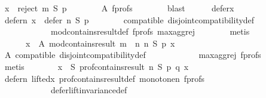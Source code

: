 \begin{isabellebody}
\ {\isachardoublequoteopen}x\ {\isasymin}\ reject\ m\ S\ p{\isachardoublequoteclose}\isanewline
\ \ \ \ \ \ \isamarkupfalse%
\ A\ f{\isacharunderscore}{\kern0pt}profs\isanewline
\ \ \ \ \ \ \isamarkupfalse%
\ blast\isanewline
\ \ \ \ \isamarkupfalse%
\ defer{\isacharunderscore}{\kern0pt}x\ \isamarkupfalse%
\ defer{\isacharunderscore}{\kern0pt}n{\isacharcolon}{\kern0pt}\ {\isachardoublequoteopen}x\ {\isasymin}\ defer\ n\ S\ p{\isachardoublequoteclose}\isanewline
\ \ \ \ \ \ \isamarkupfalse%
\ compatible\ disjoint{\isacharunderscore}{\kern0pt}compatibility{\isacharunderscore}{\kern0pt}def\isanewline
\ \ \ \ \ \ \ \ \ \ \ \ mod{\isacharunderscore}{\kern0pt}contains{\isacharunderscore}{\kern0pt}result{\isacharunderscore}{\kern0pt}def\ f{\isacharunderscore}{\kern0pt}profs\ max{\isacharunderscore}{\kern0pt}agg{\isacharunderscore}{\kern0pt}rej{}\isanewline
\ \ \ \ \ \ \isamarkupfalse%
\ metis\isanewline
\ \ \ \ \isamarkupfalse%
\isanewline
\ \ \ \ \ \ {\isachardoublequoteopen}{\isasymforall}x\ {\isasymin}\ A{\isachardot}{\kern0pt}\ mod{\isacharunderscore}{\kern0pt}contains{\isacharunderscore}{\kern0pt}result\ {\isacharparenleft}{\kern0pt}m\ {\isasymparallel}\isactrlsub {\isasymup}\ n{\isacharparenright}{\kern0pt}\ n\ S\ p\ x{\isachardoublequoteclose}\isanewline
\ \ \ \ \ \ \isamarkupfalse%
\ A\ compatible\ disjoint{\isacharunderscore}{\kern0pt}compatibility{\isacharunderscore}{\kern0pt}def\isanewline
\ \ \ \ \ \ \ \ \ \ \ \ max{\isacharunderscore}{\kern0pt}agg{\isacharunderscore}{\kern0pt}rej{}\ f{\isacharunderscore}{\kern0pt}profs\isanewline
\ \ \ \ \ \ \isamarkupfalse%
\ metis\isanewline
\ \ \ \ \isamarkupfalse%
\ \isamarkupfalse%
\ {\isachardoublequoteopen}{\isasymforall}x\ {\isasymin}\ S{\isachardot}{\kern0pt}\ prof{\isacharunderscore}{\kern0pt}contains{\isacharunderscore}{\kern0pt}result\ n\ S\ p\ q\ x{\isachardoublequoteclose}\isanewline
\ \ \ \ \ \ \isamarkupfalse%
\ defer{\isacharunderscore}{\kern0pt}n\ lifted{\isacharunderscore}{\kern0pt}x\ prof{\isacharunderscore}{\kern0pt}contains{\isacharunderscore}{\kern0pt}result{\isacharunderscore}{\kern0pt}def\ monotone{\isacharunderscore}{\kern0pt}n\ f{\isacharunderscore}{\kern0pt}profs\isanewline
\ \ \ \ \ \ \ \ \ \ \ \ defer{\isacharunderscore}{\kern0pt}lift{\isacharunderscore}{\kern0pt}invariance{\isacharunderscore}{\kern0pt}def\isanewline
\ \ \ \ \ \ \isamarkupfalse%

\end{isabellebody}
